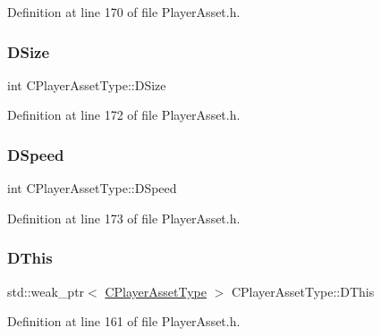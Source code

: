 Definition at line 170 of file Player\+Asset.\+h.

\hypertarget{classCPlayerAssetType_a00e59fe19f83fe37f23341c05010dbc2}{}\label{classCPlayerAssetType_a00e59fe19f83fe37f23341c05010dbc2} 
\subsubsection{\texorpdfstring{D\+Size}{DSize}}
{\footnotesize\ttfamily int C\+Player\+Asset\+Type\+::\+D\+Size\hspace{0.3cm}{\ttfamily [protected]}}



Definition at line 172 of file Player\+Asset.\+h.

\hypertarget{classCPlayerAssetType_a0e72be67119e97fb64a6036cd5da8d1a}{}\label{classCPlayerAssetType_a0e72be67119e97fb64a6036cd5da8d1a} 
\subsubsection{\texorpdfstring{D\+Speed}{DSpeed}}
{\footnotesize\ttfamily int C\+Player\+Asset\+Type\+::\+D\+Speed\hspace{0.3cm}{\ttfamily [protected]}}



Definition at line 173 of file Player\+Asset.\+h.

\hypertarget{classCPlayerAssetType_ae0d263de96ccad929d79d6b46f7b8deb}{}\label{classCPlayerAssetType_ae0d263de96ccad929d79d6b46f7b8deb} 
\subsubsection{\texorpdfstring{D\+This}{DThis}}
{\footnotesize\ttfamily std\+::weak\+\_\+ptr$<$ \hyperlink{classCPlayerAssetType}{C\+Player\+Asset\+Type} $>$ C\+Player\+Asset\+Type\+::\+D\+This\hspace{0.3cm}{\ttfamily [protected]}}



Definition at line 161 of file Player\+Asset.\+h.


